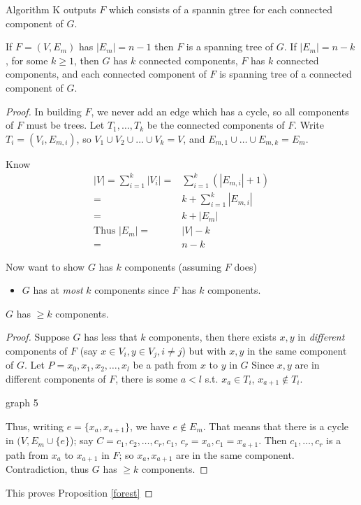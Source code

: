 \documentclass{article}
\begin{document}
Algorithm K outputs $F$ which consists of a spannin gtree for each connected component of $G$.

\begin{prop}
\label{forest}
If $F=(V,E_m)$ has $|E_m|=n-1$ then $F$ is a spanning tree of $G$.  If $|E_m| =n-k$, for some $k \geq 1$, then $G$  has $k$ connected components, $F$ has $k$ connected components, and each connected component of $F$ is spanning tree of a connected component of $G$.
\end{prop}

\begin{proof}
In building $F$, we never add an edge which has a cycle, so all components of $F$ must be trees.  Let $T_1, \ldots, T_k$ be the connected components of $F$. Write $T_i = (V_i, E_{m,i})$, so $V_1 \cup V_2 \cup \ldots \cup V_k = V$, and $E_{m,1} \cup \ldots \cup E_{m,k} = E_m$.

Know 
\begin{align*}
|V| = \displaystyle \sum_{i=1}^k |V_i| =& \sum_{i=1}^k (|E_{m,i}| +1)\\
 =& k+ \sum_{i=1}^k |E_{m,i}| \\
=& k+ |E_m| \\
\text{Thus } |E_m| =& |V|-k \\
=& n-k
\end{align*}

Now want to show $G$ has $k$ components (assuming $F$ does)

\begin{itemize}
\item $G$ has at \emph{most} $k$ components since $F$ has $k$ components.
\end{itemize}

\begin{clm}
$G$ has $\geq k$ components.
\end{clm}

\begin{proof}
Suppose $G$ has less that $k$ components, then there exists $x,y$ in \emph{different} components of $F$ (say $x \in V_i, y \in V_j, i \neq j$)  but with $x,y$ in the same component of $G$.  Let $P=x_0, x_1, x_2, \ldots, x_l$ be a path from $x$ to $y$ in $G$  Since $x,y$ are in different components of $F$, there is some $a < l$ s.t. $x_a \in T_i$, $x_{a+1} \notin T_i$.  

graph 5

Thus, writing $e = \{x_a, x_{a+1}\}$, we have $ e \notin E_m$.  That means that there is a cycle in $(V, E_m \cup \{e\}$); say $C=c_1, c_2, \ldots, c_r, c_1$, $c_r = x_a, c_1 = x_{a+1}$.  Then $c_1, \ldots, c_r$ is a path from $x_a$ to $x_{a+1}$ in $F$; so $x_a, x_{a+1}$ are in the same component.  Contradiction, thus $G$ has $ \geq k$ components.
\end{proof}

This proves Proposition \ref{forest}
\end{proof}
\end{document}
